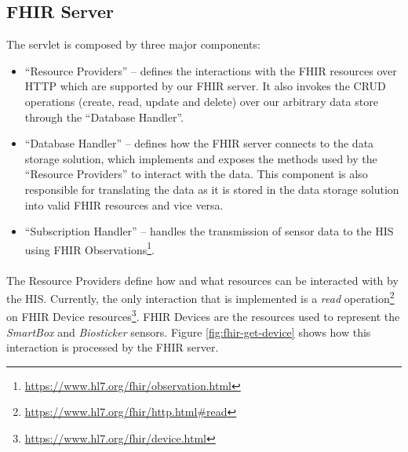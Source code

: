 \subsection{FHIR Server} 

The servlet is composed by three major components:

\begin{itemize}
    \item ``Resource Providers'' -- defines the interactions with the \acs{FHIR} resources over \acs{HTTP} which are supported by our \acs{FHIR} server. It also invokes the CRUD operations (create, read, update and delete) over our arbitrary data store through the ``Database Handler''.
    \item ``Database Handler'' -- defines how the \acs{FHIR} server connects to the data storage solution, which implements and exposes the methods used by the ``Resource Providers'' to interact with the data. This component is also responsible for translating the data as it is stored in the data storage solution into valid \acs{FHIR} resources and vice versa.
    \item ``Subscription Handler'' -- handles the transmission of sensor data to the \acs{HIS} using \acs{FHIR} Observations\footnote{\url{https://www.hl7.org/fhir/observation.html}}.
\end{itemize}

\paragraph{} The Resource Providers define how and what resources can be interacted with by the \acs{HIS}. Currently, the only interaction that is implemented is a \textit{read} operation\footnote{\url{https://www.hl7.org/fhir/http.html\#read}} on \acs{FHIR} Device resources\footnote{\url{https://www.hl7.org/fhir/device.html}}. \acs{FHIR} Devices are the resources used to represent the \textit{SmartBox} and \textit{Biosticker} sensors. Figure \ref{fig:fhir-get-device} shows how this interaction is processed by the \acs{FHIR} server.

